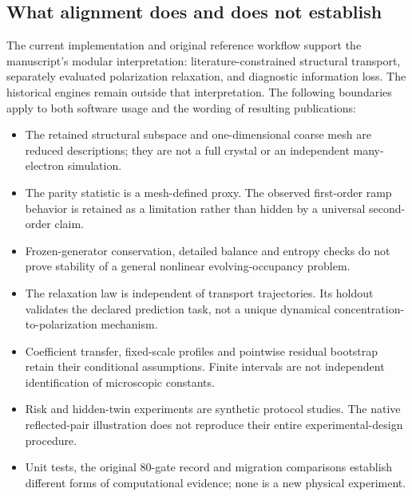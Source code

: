 \documentclass[11pt,a4paper]{article}
\begin{document}
\subsection{What alignment does and does not establish}

The current implementation and original reference workflow support the manuscript's modular interpretation: literature-constrained structural transport, separately evaluated polarization relaxation, and diagnostic information loss. The historical engines remain outside that interpretation. The following boundaries apply to both software usage and the wording of resulting publications:
\begin{itemize}
\item The retained structural subspace and one-dimensional coarse mesh are reduced descriptions; they are not a full crystal or an independent many-electron simulation.
\item The parity statistic is a mesh-defined proxy. The observed first-order ramp behavior is retained as a limitation rather than hidden by a universal second-order claim.
\item Frozen-generator conservation, detailed balance and entropy checks do not prove stability of a general nonlinear evolving-occupancy problem.
\item The relaxation law is independent of transport trajectories. Its holdout validates the declared prediction task, not a unique dynamical concentration-to-polarization mechanism.
\item Coefficient transfer, fixed-scale profiles and pointwise residual bootstrap retain their conditional assumptions. Finite intervals are not independent identification of microscopic constants.
\item Risk and hidden-twin experiments are synthetic protocol studies. The native reflected-pair illustration does not reproduce their entire experimental-design procedure.
\item Unit tests, the original 80-gate record and migration comparisons establish different forms of computational evidence; none is a new physical experiment.
\end{itemize}
\end{document}
